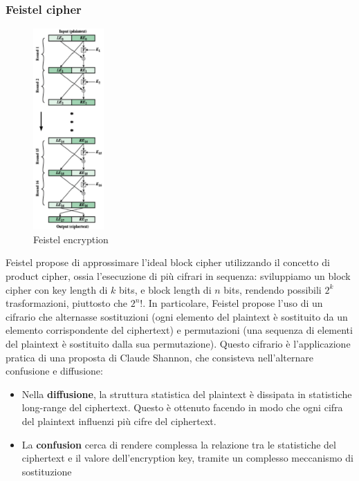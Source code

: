 \documentclass[11pt]{article}
\begin{document}
\subsubsection{Feistel cipher}
\begin{figure}
    \begin{center}
      \includegraphics[width=0.24\textwidth]{res/crypto/Feistel.png}
    \end{center}
    \caption{Feistel encryption}
  \end{figure}
Feistel propose di approssimare l'ideal block cipher utilizzando il concetto di product cipher, ossia l'esecuzione di più cifrari in sequenza: sviluppiamo un block cipher con key length di $k$ bits, e block length di $n$ bits, rendendo possibili $2^k$ trasformazioni, piuttosto che $2^n!$. In particolare, Feistel propose l'uso di un cifrario che alternasse sostituzioni (ogni elemento del plaintext è sostituito da un elemento corrispondente del ciphertext) e permutazioni (una sequenza di elementi del plaintext è sostituito dalla sua permutazione). Questo cifrario è l'applicazione pratica di una proposta di Claude Shannon, che consisteva nell'alternare confusione e diffusione:
\begin{itemize}
    \item Nella \textbf{diffusione}, la struttura statistica del plaintext è dissipata in statistiche long-range del ciphertext. Questo è ottenuto facendo in modo che ogni cifra del plaintext influenzi più cifre del ciphertext.
    \item La \textbf{confusion} cerca di rendere complessa la relazione tra le statistiche del ciphertext e il valore dell'encryption key, tramite un complesso meccanismo di sostituzione 
\end{itemize}
\end{document}

